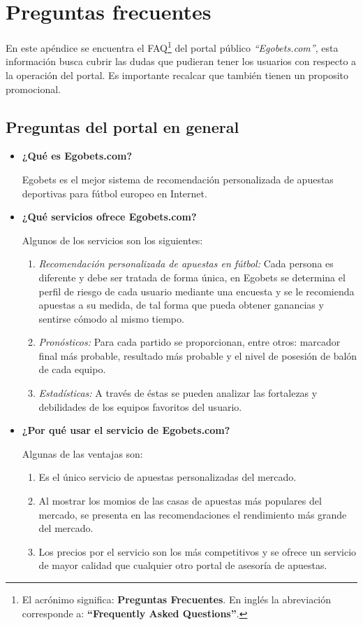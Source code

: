 \chapter{Preguntas frecuentes}\label{chap:faq}

En este apéndice se encuentra el FAQ\footnote{El acrónimo significa: \textbf{Preguntas Frecuentes}. En inglés la abreviación corresponde a: \textbf{``Frequently Asked Questions''}.} del portal público \emph{``\emph{Egobets.com}''}, esta información busca cubrir las dudas que pudieran tener los usuarios con respecto a la operación del portal. Es importante recalcar que también tienen un proposito promocional.

\section{Preguntas del portal en general}
\begin{itemize}
\item \textbf{¿Qué es Egobets.com?}


Egobets es el mejor sistema de recomendación personalizada de apuestas deportivas para fútbol europeo en Internet.

\item \textbf{¿Qué servicios ofrece Egobets.com?}


Algunos de los servicios son los siguientes:
\begin{enumerate}
	\item \emph{Recomendación personalizada de apuestas en fútbol:} Cada persona es diferente y debe ser tratada de forma única, en Egobets se determina el perfil de riesgo de cada usuario mediante una encuesta y se le recomienda apuestas a su medida, de tal forma que pueda obtener ganancias y sentirse cómodo al mismo tiempo.
	\item \emph{Pronósticos:} Para cada partido se proporcionan, entre otros: marcador final más probable, resultado más probable y el nivel de posesión de balón de cada equipo.
	\item \emph{Estadísticas:} A través de éstas se pueden analizar las fortalezas y debilidades de los equipos favoritos del usuario.
\end{enumerate}

\item \textbf{¿Por qué usar el servicio de Egobets.com?}


Algunas de las ventajas son:
\begin{enumerate}
	\item Es el único servicio de apuestas personalizadas del mercado.
	\item Al mostrar los momios de las casas de apuestas más populares del mercado, se presenta en las recomendaciones el rendimiento más grande del mercado.
	\item Los precios por el servicio son los más competitivos y se ofrece un servicio de mayor calidad que cualquier otro portal de asesoría de apuestas.
\end{enumerate}

\end{itemize}



